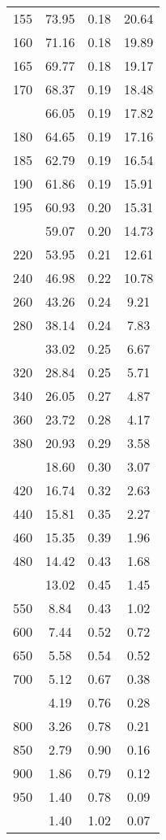 \begin{table}[ht]
\begin{tabular}{lccc}
  155 & 73.95 & 0.18 & 20.64 \\ 
  160 & 71.16 & 0.18 & 19.89 \\ 
  165 & 69.77 & 0.18 & 19.17 \\ 
  170 & 68.37 & 0.19 & 18.48 \\ 
   \addlinespace
175 & 66.05 & 0.19 & 17.82 \\ 
  180 & 64.65 & 0.19 & 17.16 \\ 
  185 & 62.79 & 0.19 & 16.54 \\ 
  190 & 61.86 & 0.19 & 15.91 \\ 
  195 & 60.93 & 0.20 & 15.31 \\ 
   \addlinespace
200 & 59.07 & 0.20 & 14.73 \\ 
  220 & 53.95 & 0.21 & 12.61 \\ 
  240 & 46.98 & 0.22 & 10.78 \\ 
  260 & 43.26 & 0.24 & 9.21 \\ 
  280 & 38.14 & 0.24 & 7.83 \\ 
   \addlinespace
300 & 33.02 & 0.25 & 6.67 \\ 
  320 & 28.84 & 0.25 & 5.71 \\ 
  340 & 26.05 & 0.27 & 4.87 \\ 
  360 & 23.72 & 0.28 & 4.17 \\ 
  380 & 20.93 & 0.29 & 3.58 \\ 
   \addlinespace
400 & 18.60 & 0.30 & 3.07 \\ 
  420 & 16.74 & 0.32 & 2.63 \\ 
  440 & 15.81 & 0.35 & 2.27 \\ 
  460 & 15.35 & 0.39 & 1.96 \\ 
  480 & 14.42 & 0.43 & 1.68 \\ 
   \addlinespace
500 & 13.02 & 0.45 & 1.45 \\ 
  550 & 8.84 & 0.43 & 1.02 \\ 
  600 & 7.44 & 0.52 & 0.72 \\ 
  650 & 5.58 & 0.54 & 0.52 \\ 
  700 & 5.12 & 0.67 & 0.38 \\ 
   \addlinespace
750 & 4.19 & 0.76 & 0.28 \\ 
  800 & 3.26 & 0.78 & 0.21 \\ 
  850 & 2.79 & 0.90 & 0.16 \\ 
  900 & 1.86 & 0.79 & 0.12 \\ 
  950 & 1.40 & 0.78 & 0.09 \\ 
   \addlinespace
1000 & 1.40 & 1.02 & 0.07 \\ 
   \bottomrule
\end{tabular}
\end{table}
